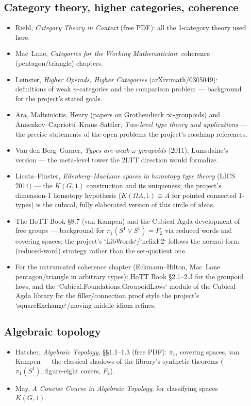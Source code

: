 \documentclass[11pt]{article}
\begin{document}
\subsection{Category theory, higher categories, coherence}
\begin{itemize}[leftmargin=1.5em]
\item Riehl, \emph{Category Theory in Context} (free PDF): all the
1-category theory used here.
\item Mac~Lane, \emph{Categories for the Working Mathematician}:
coherence (pentagon/triangle) chapters.
\item Leinster, \emph{Higher Operads, Higher Categories}
(arXiv:math/0305049): definitions of weak $n$-categories and the
comparison problem --- background for the project's stated goals.
\item Ara, Maltsiniotis, Henry (papers on Grothendieck
$\infty$-groupoids) and Annenkov--Capriotti--Kraus--Sattler,
\emph{Two-level type theory and applications} --- the precise statements
of the open problems the project's roadmap references.
\item Van den Berg--Garner, \emph{Types are weak $\omega$-groupoids}
(2011); Lumsdaine's version --- the meta-level tower the 2LTT direction
would formalize.
\item Licata--Finster, \emph{Eilenberg--MacLane spaces in homotopy type
theory} (LICS 2014) --- the $K(G,1)$ construction and its uniqueness;
the project's dimension-1 homotopy hypothesis
($K(\Omega A,1)\equiv A$ for pointed connected 1-types) is the cubical,
fully elaborated version of this circle of ideas.
\item The HoTT Book \S8.7 (van Kampen) and the Cubical Agda development
of free groups --- background for $\pi_1(S^1\vee S^1)=F_2$ via reduced
words and covering spaces; the project's `LibWords`/`helixF2` follows the
normal-form (reduced-word) strategy rather than the set-quotient one.
\item For the untruncated coherence chapter (Eckmann--Hilton, Mac~Lane
pentagon/triangle in arbitrary types): HoTT Book \S2.1--2.3 for the
groupoid laws, and the `Cubical.Foundations.GroupoidLaws` module of the
Cubical Agda library for the filler/connection proof style the project's
`squareExchange`/moving-middle idiom refines.
\end{itemize}

\subsection{Algebraic topology}
\begin{itemize}[leftmargin=1.5em]
\item Hatcher, \emph{Algebraic Topology}, \S\S1.1--1.3 (free PDF):
$\pi_1$, covering spaces, van Kampen --- the classical shadows of the
library's synthetic theorems ($\pi_1(S^1)$, figure-eight covers, $F_2$).
\item May, \emph{A Concise Course in Algebraic Topology}, for
classifying spaces $K(G,1)$.
\end{itemize}
\end{document}
